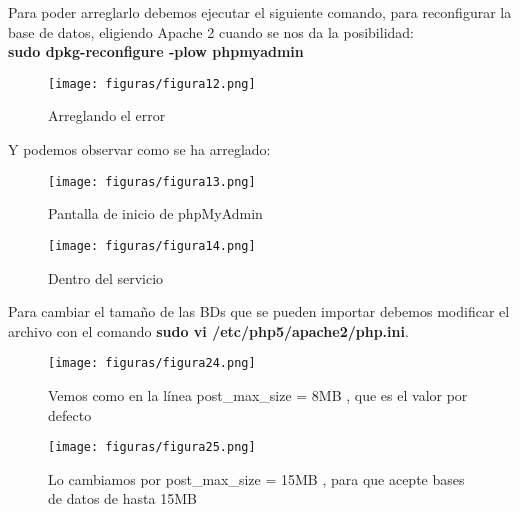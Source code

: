Para poder arreglarlo debemos ejecutar el siguiente comando, para reconfigurar la base de datos, eligiendo Apache 2 cuando se nos da la posibilidad:\\
\textbf{sudo dpkg-reconfigure -plow phpmyadmin}
\begin{figure}[H] %
	\centering
	\texttt{[image: figuras/figura12.png]}  %
	\label{figura12}
	
	\caption{Arreglando el error} 
\end{figure}
Y podemos observar como se ha arreglado:
\begin{figure}[H] %
	\centering
	\texttt{[image: figuras/figura13.png]}  %
	\label{figura13}
	
	\caption{Pantalla de inicio de phpMyAdmin} 
\end{figure}
\begin{figure}[H] %
	\centering
	\texttt{[image: figuras/figura14.png]}  %
	\label{figura14}
	
	\caption{Dentro del servicio} 
\end{figure}
 
 Para cambiar el tamaño de las BDs que se pueden importar \cite{php-size} debemos modificar el archivo con el comando \textbf{sudo vi /etc/php5/apache2/php.ini}.
 
\begin{figure}[H] %
	\centering
	\texttt{[image: figuras/figura24.png]}  %
	\label{figura24}
	
	\caption{Vemos como en la línea post\_max\_size = 8MB , que es el valor por defecto } 
\end{figure}

\begin{figure}[H] %
	\centering
	\texttt{[image: figuras/figura25.png]}  %
	\label{figura25}
	
	\caption{Lo cambiamos por  post\_max\_size = 15MB , para que acepte bases de datos de hasta 15MB} 
\end{figure}

